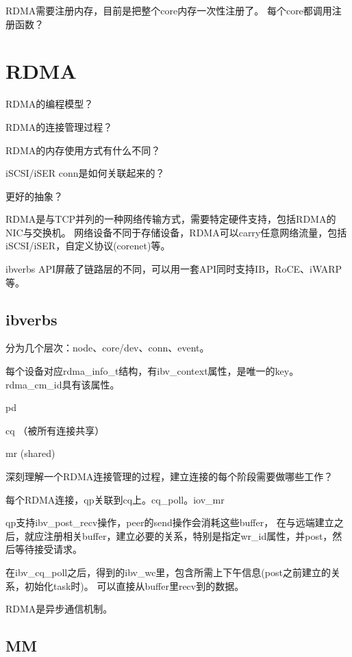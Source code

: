 RDMA需要注册内存，目前是把整个core内存一次性注册了。
每个core都调用注册函数？

\section{RDMA}

\begin{enumbox}
\item RDMA的编程模型？
\item RDMA的连接管理过程？
\item RDMA的内存使用方式有什么不同？
\item iSCSI/iSER conn是如何关联起来的？
\item 更好的抽象？
\end{enumbox}

RDMA是与TCP并列的一种网络传输方式，需要特定硬件支持，包括RDMA的NIC与交换机。
网络设备不同于存储设备，RDMA可以carry任意网络流量，包括iSCSI/iSER，自定义协议(corenet)等。

ibverbs API屏蔽了链路层的不同，可以用一套API同时支持IB，RoCE、iWARP等。

\subsection{ibverbs}

分为几个层次：node、core/dev、conn、event。

每个设备对应rdma\_info\_t结构，有ibv\_context属性，是唯一的key。
rdma\_cm\_id具有该属性。

\begin{itembox}
\item pd
\item cq （被所有连接共享）
\item mr  (shared)
\end{itembox}

深刻理解一个RDMA连接管理的过程，建立连接的每个阶段需要做哪些工作？

每个RDMA连接，qp关联到cq上。cq\_poll。iov\_mr

qp支持ibv\_post\_recv操作，peer的send操作会消耗这些buffer，
在与远端建立之后，就应注册相关buffer，建立必要的关系，特别是指定wr\_id属性，并post，然后等待接受请求。

在ibv\_cq\_poll之后，得到的ibv\_wc里，包含所需上下午信息(post之前建立的关系，初始化task时)。
可以直接从buffer里recv到的数据。

RDMA是异步通信机制。

\subsection{MM}

